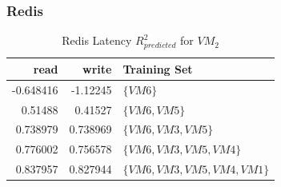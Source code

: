 \documentclass{beamer}
\begin{document}
\begin{frame}
\frametitle{Redis}
\begin{table}
\centering
\caption{Redis Latency $R_{predicted}^2$ for $VM_2$}
\begin{tabular}{|r|r|l|} \hline
read&write&Training Set\\ \hline
-0.648416 & -1.12245  & $\{VM6\}$ \\ \hline 
0.51488 &  0.41527 & $\{VM6,VM5\}$ \\ \hline 
0.738979 &  0.738969 & $\{VM6,VM3,VM5\}$ \\ \hline 
0.776002 & 0.756578  & $\{VM6,VM3,VM5,VM4\}$ \\ \hline 
0.837957 &  0.827944 & $\{VM6,VM3,VM5,VM4,VM1\}$ \\ \hline 
\hline\end{tabular}



\end{table}
\end{frame}
\end{document}

